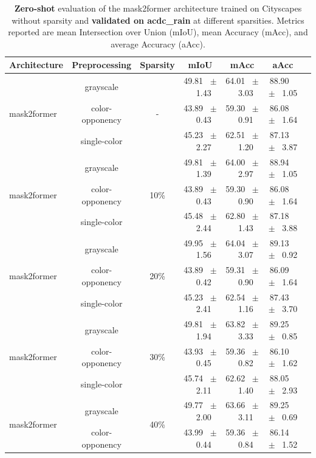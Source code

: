 \begin{table}[h]
  \centering
  \caption{\textbf{Zero-shot} evaluation of the mask2former architecture trained on Cityscapes without sparsity and \textbf{validated on acdc_rain} at different sparsities. Metrics reported are mean Intersection over Union (mIoU), mean Accuracy (mAcc), and average Accuracy (aAcc).}
  \begin{tabular}{@{}lccc ccc@{}}
    \toprule
    Architecture & Preprocessing & Sparsity & mIoU & mAcc & aAcc \\
    \midrule
    \multirow{3}{*}{mask2former} & grayscale & \multirow{3}{*}{-} & 49.81 ~$\pm$~ 1.43 & 64.01 ~$\pm$~ 3.03 & 88.90 ~$\pm$~ 1.05 \\
    & color-opponency &  & 43.89 ~$\pm$~ 0.43 & 59.30 ~$\pm$~ 0.91 & 86.08 ~$\pm$~ 1.64 \\
    & single-color &  & 45.23 ~$\pm$~ 2.27 & 62.51 ~$\pm$~ 1.20 & 87.13 ~$\pm$~ 3.87 \\
    \midrule
    \multirow{3}{*}{mask2former} & grayscale & \multirow{3}{*}{10\%} & 49.81 ~$\pm$~ 1.39 & 64.00 ~$\pm$~ 2.97 & 88.94 ~$\pm$~ 1.05 \\
    & color-opponency &  & 43.89 ~$\pm$~ 0.43 & 59.30 ~$\pm$~ 0.90 & 86.08 ~$\pm$~ 1.64 \\
    & single-color &  & 45.48 ~$\pm$~ 2.44 & 62.80 ~$\pm$~ 1.43 & 87.18 ~$\pm$~ 3.88 \\
    \midrule
    \multirow{3}{*}{mask2former} & grayscale & \multirow{3}{*}{20\%} & 49.95 ~$\pm$~ 1.56 & 64.04 ~$\pm$~ 3.07 & 89.13 ~$\pm$~ 0.92 \\
    & color-opponency &  & 43.89 ~$\pm$~ 0.42 & 59.31 ~$\pm$~ 0.90 & 86.09 ~$\pm$~ 1.64 \\
    & single-color &  & 45.23 ~$\pm$~ 2.41 & 62.54 ~$\pm$~ 1.16 & 87.43 ~$\pm$~ 3.70 \\
    \midrule
    \multirow{3}{*}{mask2former} & grayscale & \multirow{3}{*}{30\%} & 49.81 ~$\pm$~ 1.94 & 63.82 ~$\pm$~ 3.33 & 89.25 ~$\pm$~ 0.85 \\
    & color-opponency &  & 43.93 ~$\pm$~ 0.45 & 59.36 ~$\pm$~ 0.82 & 86.10 ~$\pm$~ 1.62 \\
    & single-color &  & 45.74 ~$\pm$~ 2.11 & 62.62 ~$\pm$~ 1.40 & 88.05 ~$\pm$~ 2.93 \\
    \midrule
    \multirow{3}{*}{mask2former} & grayscale & \multirow{3}{*}{40\%} & 49.77 ~$\pm$~ 2.00 & 63.66 ~$\pm$~ 3.11 & 89.25 ~$\pm$~ 0.69 \\
    & color-opponency &  & 43.99 ~$\pm$~ 0.44 & 59.36 ~$\pm$~ 0.84 & 86.14 ~$\pm$~ 1.52 \\

\end{tabular}
\end{table}
